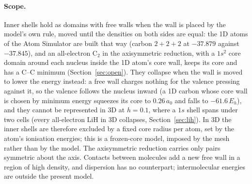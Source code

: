 \documentclass[11pt]{article}
\begin{document}
\paragraph{Scope.} Inner shells hold as domains with free walls when the wall is placed by the model's own
rule, moved until the densities on both sides are equal: the 1D atoms of the Atom Simulator are built that way
(carbon $2{+}2{+}2$ at $-37.879$ against $-37.845$), and an all-electron C$_2$ in the axisymmetric reduction, with
a $1s^2$ core domain around each nucleus inside the 1D atom's core wall, keeps its core and has a C--C minimum
(Section~\ref{sec:open}). They collapse when the wall is moved to lower the energy instead: a free wall charges
nothing for the valence pressing against it, so the valence follows the nucleus inward (a 1D carbon whose core
wall is chosen by minimum energy squeezes its core to $0.26\,a_0$ and falls to $-61.6\,E_h$), and they cannot be
represented in 3D at $h = 0.1$, where a $1s$ shell spans under two cells (every all-electron LiH in 3D collapses,
Section~\ref{sec:lih}). In 3D the inner shells are therefore excluded by a fixed core radius per atom, set by the
atom's ionisation energies; this is a frozen-core model, imposed by the mesh rather than by the model. The axisymmetric reduction carries only pairs symmetric about the axis. Contacts
between molecules add a new free wall in a region of high density, and dispersion has no counterpart;
intermolecular energies are outside the present model.
\end{document}
